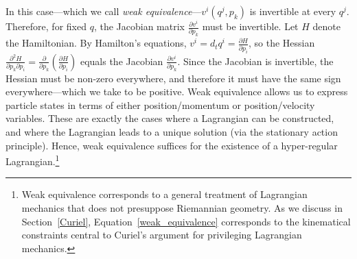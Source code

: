 \documentclass[12pt, english, twoside]{article} %
\begin{document}
In this case---which we call \textit{weak equivalence}---$v^i(q^j, p_k)$ is invertible at every $q^j$. Therefore, for fixed $q$, the Jacobian matrix  $\frac{\partial v^i}{\partial p_k}$ must be invertible. Let $H$ denote the Hamiltonian. By Hamilton's equations, $v^i = d_t q^i = \frac{\partial H}{\partial p_i}$, so the Hessian $\frac{\partial^2 H}{\partial p_k \partial p_i} = \frac{\partial}{\partial p_k} (\frac{\partial H}{\partial p_i})$ equals the Jacobian $\frac{\partial v^i}{\partial p_k}$. Since the Jacobian is invertible, the Hessian must be non-zero everywhere, and therefore it must have the same sign everywhere---which we take to be positive. Weak equivalence allows us to express particle states in terms of either position/momentum or position/velocity variables. These are exactly the cases where a Lagrangian can be constructed, and where the Lagrangian leads to a unique solution (via the stationary action principle). Hence, weak equivalence suffices for the existence of a hyper-regular Lagrangian.\footnote{Weak equivalence corresponds to a general treatment of Lagrangian mechanics that does not presuppose Riemannian geometry. As we discuss in Section~\ref{Curiel}, Equation~\ref{weak_equivalence} corresponds to the kinematical constraints central to Curiel's \parencites*[]{Curiel} argument for privileging Lagrangian mechanics.}
\end{document}
